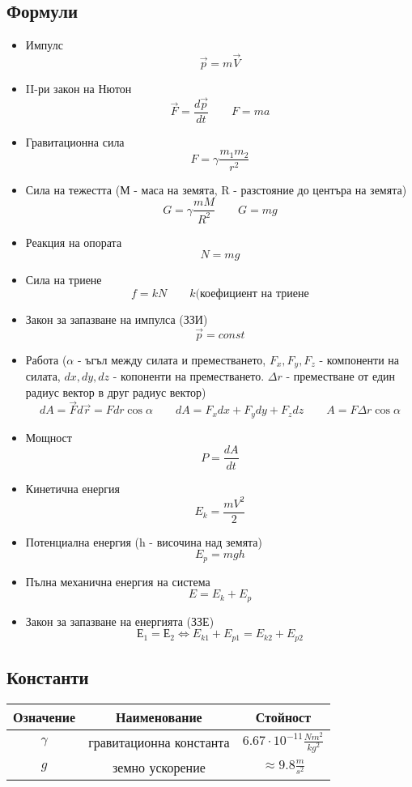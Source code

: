 \documentclass[fleqn, 12pt]{article}
\theoremstyle{definition}
\begin{document}
\subsection{Формули}
\begin{itemize}
\item Импулс
$$\vec{p} = m \vec{V}$$
\item II-ри закон на Нютон
$$\vec{F} = \frac{d \vec{p}}{dt} \qquad F= ma$$
\item Гравитационна сила
$$F = \gamma \frac{m_1 m_2}{r^2}$$
\item Сила на тежестта (М - маса на земята, R - разстояние до центъра на земята)
$$G = \gamma \frac{mM}{R^2} \qquad G = mg$$
\item Реакция на опората
$$N = mg$$
\item Сила на триене
$$f = kN \qquad k(\text{коефициент на триене}$$
\item Закон за запазване на импулса (ЗЗИ) 
$$\vec{p} = const$$
\item Работа ($\alpha$ - ъгъл между силата и преместването, $F_x, F_y, F_z$ - компоненти на силата, $dx,dy,dz$ - копоненти на преместването. $\Delta r$ - преместване от един радиус вектор в друг радиус вектор)
$$dA = \vec{F} d\vec{r} = F dr \cos \alpha \qquad dA = F_x dx + F_y dy + F_z dz \qquad A = F \Delta r \cos \alpha$$
\item Мощност 
$$P = \frac{dA}{dt}$$
\item Кинетична енергия 
$$E_k = \frac{mV^2}{2}$$
\item Потенциална енергия (h - височина над земята)
$$E_p = mgh$$
\item Пълна механична енергия на система
$$E = E_k + E_p$$
\item Закон за запазване на енергията (ЗЗЕ)
$$Е_1 = Е_2 \Leftrightarrow E_{k1} + E_{p1} = E_{k2} + E_{p2}$$
\end{itemize}
\newpage
\subsection{Константи}

\begin{center}
\begin{tabular}{ |c|c|c|}
\hline
\textbf{Означение} & \textbf{Наименование}&\textbf{Стойност}\\
\hline
$\gamma$ & гравитационна константа & $6.67 \cdot 10^{-11} \frac{N m^2}{kg^2}$ \\
\hline
$g$ & земно ускорение & $\approx 9.8 \frac{m}{s^2}$ \\
\hline
\end{tabular}
\end{center}
\end{document}
